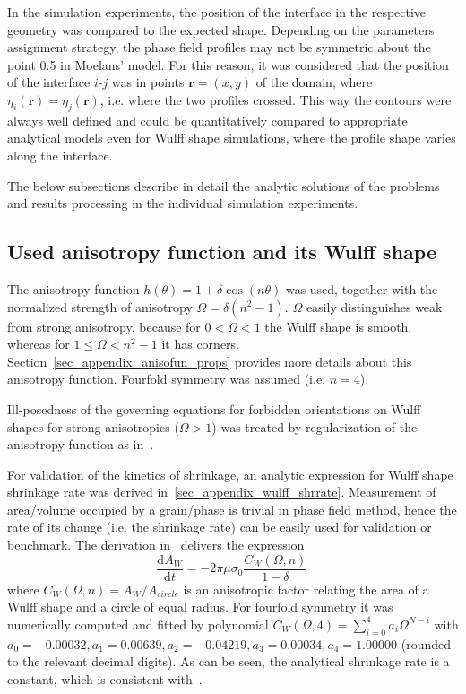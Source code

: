 In the simulation experiments, the position of the interface in the respective geometry was compared to the expected shape. Depending on the parameters assignment strategy, the phase field profiles may not be symmetric about the point 0.5 in Moelans' model. For this reason, it was considered that the position of the interface $i$-$j$ was in points $\bm{r}=(x,y)$ of the domain, where $\eta_i(\bm{r})=\eta_j(\bm{r})$, i.e. where the two profiles crossed. This way the contours were always well defined and could be quantitatively compared to appropriate analytical models even for Wulff shape simulations, where the profile shape varies along the interface.

The below subsections describe in detail the analytic solutions of the problems and results processing in the individual simulation experiments. 

\subsection{Used anisotropy function and its Wulff shape}
The anisotropy function $h(\theta)=1+\delta\cos(n\theta)$ was used, together with the normalized strength of anisotropy $\Omega=\delta(n^2-1)$. $\Omega$ easily distinguishes weak from strong anisotropy, because for $0<\Omega<1$ the Wulff shape is smooth, whereas for $1\leq\Omega<n^2-1$ it has corners. Section~\ref{sec_appendix_anisofun_props} provides more details about this anisotropy function. Fourfold symmetry was assumed (i.e. $n=4$).

Ill-posedness of the governing equations for forbidden orientations on Wulff shapes for strong anisotropies ($\Omega>1$) was treated by regularization of the anisotropy function as in~\cite{Eggleston2001}.

For validation of the kinetics of shrinkage, an analytic expression for Wulff shape shrinkage rate was derived in~\ref{sec_appendix_wulff_shrrate}. Measurement of area/volume occupied by a grain/phase is trivial in phase field method, hence the rate of its change (i.e. the shrinkage rate) can be easily used for validation or benchmark. The derivation in~\cite{Minar2021suppl} delivers the expression
\begin{equation}\label{eq_wulff_shrrate}
	\frac{\mathrm{d}A_W}{\mathrm{d}t} = -2\pi\mu\sigma_0  \frac{C_W(\Omega,n)}{1-\delta} \,
\end{equation}
where $C_W(\Omega,n)=A_W/A_{circle}$ is an anisotropic factor relating the area of a Wulff shape and a circle of equal radius. For fourfold symmetry it was numerically computed and fitted by polynomial $C_W(\Omega,4)= \sum_{i=0}^4a_i\Omega^{N-i}$ with $a_0=-0.00032 ,a_1=0.00639 ,a_2=-0.04219 , a_3=0.00034 , a_4=1.00000$ (rounded to the relevant decimal digits). As can be seen, the analytical shrinkage rate is a constant, which is consistent with~\cite{Taylor1998}.

